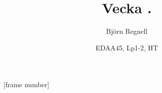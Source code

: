 [frame number]



\title[Föreläsning i ''Programmering, grundkurs'', Björn Regnell, senast uppdaterad: \today]{Vecka \vecka. \veckotema}
\author{Björn Regnell}
\date{EDAA45, Lp1-2, HT \CurrentYear}


